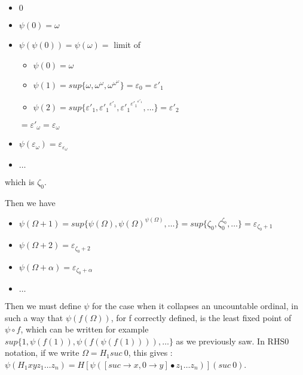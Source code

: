 \documentclass[10pt]{article}
\begin{document}
\begin{itemize}
     \setlength{\itemsep}{1pt}
     \setlength{\parskip}{0pt}
     \setlength{\parsep}{0pt}
\item \( 0 \)
\item \( \psi(0) = \omega \)
\item \( \psi(\psi(0)) = \psi(\omega) = \) limit of
	\begin{itemize}
	     \setlength{\itemsep}{1pt}
	     \setlength{\parskip}{0pt}
	     \setlength{\parsep}{0pt}
	\item \( \psi(0) = \omega \)
	\item \( \psi(1) =  sup \lbrace \omega, \omega^\omega, \omega^{\omega^\omega} \rbrace = \varepsilon_0 = \varepsilon'_1 \)
	\item \( \psi(2) = sup \lbrace \varepsilon'_1, {\varepsilon'_1}^{\varepsilon'_1}, {\varepsilon'_1}^{{\varepsilon'_1}^{\varepsilon'_1}}, \ldots \rbrace = \varepsilon'_2 \)
	\end{itemize}
	\( = \varepsilon'_\omega = \varepsilon_\omega \)
\item \( \psi(\varepsilon_\omega) = \varepsilon_{\varepsilon_\omega} \)
\item \( \ldots \)
\end{itemize}

which is \( \zeta_0 \).

Then we have

\begin{itemize}
     \setlength{\itemsep}{1pt}
     \setlength{\parskip}{0pt}
     \setlength{\parsep}{0pt}
\item \( \psi(\Omega+1) = sup \lbrace \psi(\Omega), \psi(\Omega)^{\psi(\Omega)}, \ldots \rbrace = sup \lbrace \zeta_0, \zeta_0^{\zeta_0}, \ldots \rbrace = \varepsilon_{\zeta_0+1} \)
\item \( \psi(\Omega+2) = \varepsilon_{\zeta_0+2} \)
\item \( \psi(\Omega+\alpha) = \varepsilon_{\zeta_0+\alpha} \)

\item \( \ldots \)
\end{itemize}

\bigskip

Then we must define \( \psi \) for the case when it collapses an uncountable ordinal, in such a way that \( \psi(f(\Omega)) \), for f correctly defined, is the least fixed point of \( \psi \circ f \), which can be written for example \( sup \lbrace 1, \psi(f(1)), \psi(f(\psi(f(1)))), \ldots \rbrace \)  as we previously saw. In RHS0 notation, if we write \( \Omega = H_1 suc\ 0 \), this gives : \( \psi (H_1 x y z_1 \ldots z_n) = H [\psi([suc \rightarrow x, 0 \rightarrow y] \bullet z_1 \ldots z_n)] (suc\ 0) \).
\end{document}
